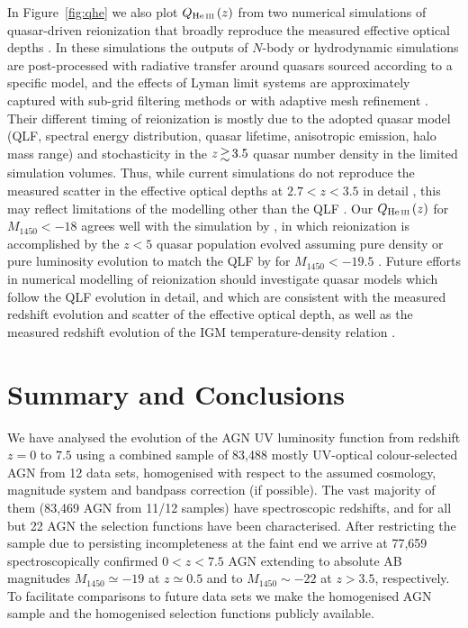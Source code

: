 \documentclass[fleqn,usenatbib]{mnras}
\begin{document}
In Figure~\ref{fig:qhe} we also plot $Q_\ion{He}{iii}\left(z\right)$
from two numerical simulations of quasar-driven 
reionization \citep{2009ApJ...694..842M,2014MNRAS.445.4186C} that
broadly reproduce the measured  effective optical depths
\citep{2016ApJ...825..144W}.  In these simulations the outputs of
$N$-body or hydrodynamic simulations are post-processed with radiative
transfer around quasars sourced according to a specific model, and the
effects of  Lyman limit systems are approximately captured
with sub-grid filtering methods \citep{2009ApJ...694..842M} or with
adaptive mesh refinement \citep{2014MNRAS.445.4186C}.  Their different
timing of  reionization is mostly due to the adopted
quasar model (QLF, spectral energy distribution, quasar lifetime,
anisotropic emission, halo mass range) and stochasticity in the $z\ga
3.5$ quasar number density in the limited simulation volumes.  Thus,
while current simulations do not reproduce the measured scatter in the
 effective optical depths at $2.7<z<3.5$ in detail
\citep{2016ApJ...825..144W}, this may reflect limitations of the
modelling other than the QLF \citep{2017MNRAS.468.4691D}.  Our
$Q_\ion{He}{iii}\left(z\right)$ for $M_{1450}<-18$ agrees well with
the simulation by \citet{2014MNRAS.445.4186C}, in which 
reionization is accomplished by the $z<5$ quasar population evolved
assuming pure density or pure luminosity evolution to match the QLF by
\citet{2011ApJ...728L..26G} for $M_{1450}<-19.5$ \citep[see
  also][]{2013MNRAS.435.3169C}.  Future efforts in numerical modelling
of  reionization should investigate quasar models which
follow the QLF evolution in detail, and which are consistent with the
measured redshift evolution and scatter of the  effective
optical depth, as well as the measured redshift evolution of the IGM
temperature-density relation \citep[e.g.][]{2011MNRAS.410.1096B,
  2014MNRAS.441.1916B, 2018MNRAS.474.2871R, 2017arXiv171000700H}.


\section{Summary and Conclusions}
\label{sec:conc}

We have analysed the evolution of the AGN UV luminosity function from redshift $z=0$ to $7.5$
using a combined sample of 83,488 mostly UV-optical colour-selected AGN from 12 data sets,
homogenised with respect to the assumed cosmology, magnitude system and bandpass correction (if possible).
The vast majority of them (83,469 AGN from 11/12 samples) have spectroscopic redshifts,
and for all but 22 AGN the selection functions have been characterised.
After restricting the sample due to persisting incompleteness at the faint end we arrive at 77,659 spectroscopically
confirmed $0<z<7.5$ AGN extending to absolute AB magnitudes $M_{1450}\simeq -19$ at $z\simeq 0.5$
and to $M_{1450}\sim -22$ at $z>3.5$, respectively. 
To facilitate comparisons to future data sets we make the homogenised AGN sample and
the homogenised selection functions publicly available.
\end{document}
